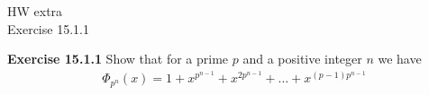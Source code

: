 \documentclass{article}
\begin{document}
\maketitle
HW extra \\
Exercise 15.1.1\\
\pagebreak

\begin{homeworkProblem}
    \textbf{Exercise 15.1.1} Show that for a prime $p$ and a positive integer $n$ we have
    \begin{align}
        \Phi_{p^n} (x) = 1 + x^{p^{n-1}} + x^{2 p^{n-1}} + \ldots + x^{(p-1) p^{n-1}}
    \end{align}
    
    \solution \\



\end{homeworkProblem}

\pagebreak
\end{document}
